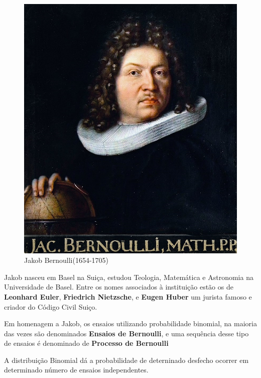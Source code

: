 \vspace{-1.68cm}
\begin{figure}
    \centering
\includegraphics[scale=0.25]{figures/Jakob_Bernoulli.jpeg}
    \caption{Jakob Bernoulli(1654-1705)}
    \label{fig:my_label4}
\end{figure}

Jakob nasceu em Basel na Suiça, estudou Teologia, Matemática e Astronomia na Universidade de Basel. Entre os nomes associados à instituição estão os de \textbf{Leonhard Euler}, \textbf{Friedrich Nietzsche}, e \textbf{Eugen Huber} um jurista famoso e criador do Código Civil Suiço. \vskip0.3cm



\newpage
Em homenagem a Jakob, os ensaios utilizando probabilidade binomial, na maioria das vezes são denominados \textbf{Ensaios de Bernoulli}, e uma sequência desse tipo de ensaios é denominado de \textbf{Processo de Bernoulli} 



A distribuição Binomial dá a probabilidade de deterninado desfecho ocorrer em determinado número de ensaios independentes. \vskip0.3cm


